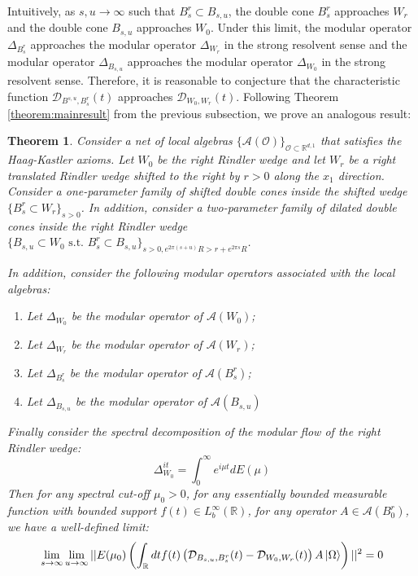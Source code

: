 \documentclass[a4paper,11pt]{article}
\newtheorem{theorem}{Theorem}
\theoremstyle{definition}
\newcommand{\lb}{\left(}
\newcommand{\rb}{\right)}
\begin{document}
Intuitively, as $s,u\rightarrow\infty$ such that $B^r_s\subset B_{s,u}$, the double cone $B^r_s$ approaches $W_r$ and the double cone $B_{s,u}$ approaches $W_0$. Under this limit, the modular operator $\Delta_{B^r_s}$ approaches the modular operator $\Delta_{W_r}$ in the strong resolvent sense\cite{takesaki2} and the modular operator $\Delta_{B_{s,u}}$ approaches the modular operator $\Delta_{W_0}$ in the strong resolvent sense. Therefore, it is reasonable to conjecture that the characteristic function $\mathcal{D}_{B^{s,u}, B^r_s}(t)$ approaches $\mathcal{D}_{W_0,W_r}(t)$. Following Theorem \ref{theorem:mainresult} from the previous subsection, we prove an analogous result:
\begin{theorem}\label{theorem:ballinsideball}
    Consider a net of local algebras $\{\mathcal{A}(\mathcal{O})\}_{\mathcal{O}\subset\mathbb{R}^{d,1}}$ that satisfies the Haag-Kastler axioms. Let $W_0$ be the right Rindler wedge and let $W_r$ be a right translated Rindler wedge shifted to the right by $r > 0$ along the $x_1$ direction. Consider a one-parameter family of shifted double cones inside the shifted wedge $\{B^r_s\subset W_r\}_{s > 0}$. In addition, consider a two-parameter family of dilated double cones inside the right Rindler wedge $\{B_{s,u}\subset W_0\text{ s.t.  }B^r_s\subset B_{s,u}\}_{s > 0, e^{2\pi(s+u)}R > r + e^{2\pi s}R}$. 

    In addition, consider the following modular operators associated with the local algebras:
    \begin{enumerate}
        \item Let $\Delta_{W_0}$ be the modular operator of $\mathcal{A}(W_0)$;
        \item Let $\Delta_{W_r}$ be the modular operator of $\mathcal{A}(W_r)$;
        \item Let $\Delta_{B^r_s}$ be the modular operator of $\mathcal{A}(B^r_s)$;
        \item Let $\Delta_{B_{s,u}}$ be the modular operator of $\mathcal{A}(B_{s,u})$
    \end{enumerate}
    Finally consider the spectral decomposition of the modular flow of the right Rindler wedge:
    \begin{equation}
        \Delta^{it}_{W_0} = \int_0^\infty e^{i\mu t}dE(\mu)
    \end{equation}
    Then for any spectral cut-off $\mu_0 > 0$, for any essentially bounded measurable function with bounded support $f(t)\in L^\infty_b(\mathbb{R})$, for any operator $A\in\mathcal{A}(B^r_0)$, we have a well-defined limit:
    \begin{align}
        \begin{split}
            \lim_{s\rightarrow\infty}\lim_{u\rightarrow\infty}||E(\mu_0)\lb\int_\mathbb{R} dt f(t)\lb \mathcal{D}_{B_{s,u}, B^r_s}(t) - \mathcal{D}_{W_0,W_r}(t) \rb A\ket{\Omega}\rb||^2 = 0
        \end{split}
    \end{align}
\end{theorem}
\end{document}
